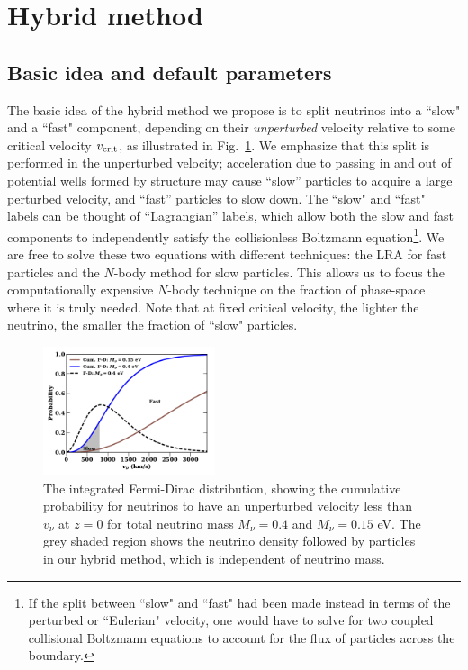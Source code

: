 \documentclass[useAMS, usenatbib]{mnras}
\begin{document}
\section{Hybrid method} \label{sec:hybrid}

\subsection{Basic idea and default parameters}

The basic idea of the hybrid method we propose is to split neutrinos into a ``slow" and a ``fast" component, depending on their \emph{unperturbed} velocity relative to some critical velocity $v_{\rm crit}$, as illustrated in Fig.~\ref{fig:fddistribution}. We emphasize that this split is performed in the unperturbed velocity; acceleration due to passing in and out of potential wells formed by structure may cause ``slow'' particles to acquire a large perturbed velocity, and ``fast'' particles to slow down. The ``slow" and ``fast" labels can be thought of ``Lagrangian'' labels, which allow both the slow and fast components to independently satisfy the collisionless Boltzmann equation\footnote{If the split between ``slow" and ``fast" had been made instead in terms of the perturbed or ``Eulerian" velocity, one would have to solve for two coupled collisional Boltzmann equations to account for the flux of particles across the boundary.}. We are free to solve these two equations with different techniques: the LRA for fast particles and the $N$-body method for slow particles. This allows us to focus the computationally expensive $N$-body technique on the fraction of phase-space where it is truly needed. Note that at fixed critical velocity, the lighter the neutrino, the smaller the fraction of ``slow" particles.

\begin{figure}
\includegraphics[width=0.45\textwidth]{nuplots/fermidirac.pdf}
  \caption{The integrated Fermi-Dirac distribution, showing the cumulative probability for neutrinos to have an unperturbed velocity less than $v_\nu$ at $z=0$ for total neutrino mass $M_\nu = 0.4$ and $M_\nu = 0.15$ eV.
  The grey shaded region shows the neutrino density followed by particles in our hybrid method, which is independent of neutrino mass.
  }
  \label{fig:fddistribution}
\end{figure}
\end{document}
